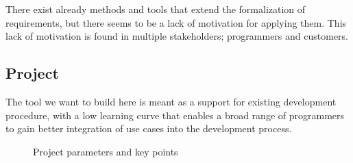 There exist already methods and tools that extend the formalization of requirements, but there seems to be a lack of motivation for applying them. This lack of motivation is found in multiple stakeholders; programmers and customers.

\subsection{Project}
The tool we want to build here is meant as a support for existing development procedure, with a low learning curve that enables a broad range of programmers to gain better integration of use cases into the development process.
\begin{figure}
\centering
{}
\caption{Project parameters and key points}
\label{fig:project_parameter_plot}
\end{figure}

